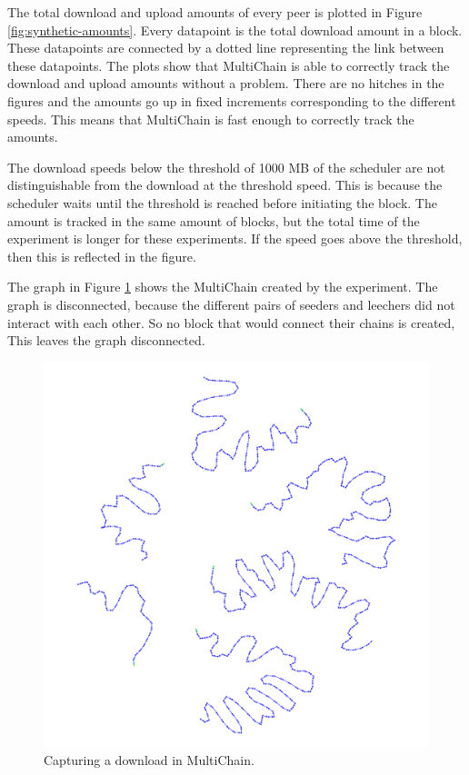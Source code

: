 The total download and upload amounts of every peer is plotted in Figure \ref{fig:synthetic-amounts}.
Every datapoint is the total download amount in a block.
These datapoints are connected by a dotted line representing the link between these datapoints.
The plots show that MultiChain is able to correctly track the download and upload amounts without a problem.
There are no hitches in the figures and the amounts go up in fixed increments corresponding to the different speeds.
This means that MultiChain is fast enough to correctly track the amounts.

The download speeds below the threshold of 1000 MB of the scheduler
are not distinguishable from the download at the threshold speed.
This is because the scheduler waits until the threshold is reached before initiating the block.
The amount is tracked in the same amount of blocks,
but the total time of the experiment is longer for these experiments.
If the speed goes above the threshold, then this is reflected in the figure.

The graph in Figure \ref{fig:synthetic-graph} shows the MultiChain created by the experiment.
The graph is disconnected, because the different pairs of seeders and leechers did not interact with each other.
So no block that would connect their chains is created,
This leaves the graph disconnected.

\begin{figure}
	\centerline{\includegraphics[scale=0.06]{experimentation/synthetic/synthetic.png}}
	\caption{Capturing a download in MultiChain.}
	\label{fig:synthetic-graph}
\end{figure}

